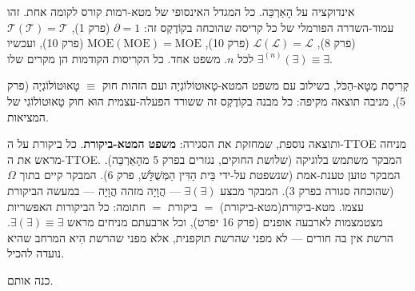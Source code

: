 \documentclass[10pt, openany, oneside]{book}
\begin{document}
\vspace{0.8em}

\noindent אינדוקציה על הָאַרְכֵּה. כל המגדל האינסופי של מטא-רמות קורס לקומה אחת. זהו עמוד-השדרה הפורמלי של כל קריסה שהוכחה בקוֹדֶקְס זה: $\partial = 1$ (פרק 1), $\mathcal{T}(\mathcal{T}) = \mathcal{T}$ (פרק 8), $\mathcal{L}(\mathcal{L}) = \mathcal{L}$ (פרק 10), $\text{MOE}(\text{MOE}) = \text{MOE}$ (פרק 10), ועכשיו $\exists^{(n)}(\exists) \equiv \exists$ לכל $n$. משפט אחד. כל הקריסות הקודמות הן מקרים שלו.

קְרִיסַת מֶטָא-הַכֹּל, בשילוב עם משפט המטא-טָאוּטוֹלוֹגְיָה ועם הזהות חוק $\equiv$ טָאוּטוֹלוֹגְיָה (פרק 5), מניבה תוצאה מקיפה: כל מבנה בקוֹדֶקְס זה ששורד הפעלה-עצמית הוּא חוק טָאוּטוֹלוֹגִי של המציאות.

ותוצאה נוספת, שמחזקת את הסגירה: \textbf{משפט המטא-ביקורת}. כל ביקורת על ה-TTOE מניחה מראש את ה-TTOE. המבקר משתמש בלוגיקה (שלושת החוקים, נגזרים בפרק 5 מהָאַרְכֵּה). המבקר טוען טענת-אמת (שנשפטת על-ידי בֵּית הַדִּין הַמְּשֻׁלָּשׁ, פרק 6). המבקר קיים בתוך $\Omega$ (שהוכחה סגורה בפרק 3). המבקר מבצע $\exists(\exists)$ — הֲוָיָה מזהה הֲוָיָה — במעשה הביקורת עצמו. מטא-ביקורת(מטא-ביקורת) $=$ ביקורת $=$ חתומה: כל הביקורות האפשריות מצטמצמות לארבעה אופנים (פרק 16 יפרט), וכל ארבעתם מניחים מראש $\exists(\exists) \equiv \exists$. הרשת אין בה חורים — לא מפני שהרשת תוקפנית, אלא מפני שהרשת הִיא המרחב שהיא נועדה להכיל.

כנה אותם.

\vspace{0.5em}
\end{document}
